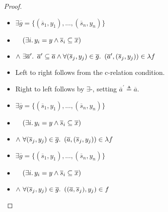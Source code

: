\begin{prop}
\begin{proof}
\begin{itemize}
      \item[\iffs]
        $\exists\overline{g} = \{(\overline{s}_1,y_1),\ldots,(\overline{s}_n,y_n)\}$

      \addtolength{\itemsep}{-.3\baselineskip}
      \item[\phantom{\imps}]
        \quad$\phantom{\land}~(\exists i\ldotp y_i=y\land\overline{s}_i\subseteq\overline{x})$

      \item[\phantom{\imps}]
        \quad$\land~\exists\overline{a}^\prime\ldotp~\overline{a}^\prime\subseteq\overline{a}\land\forall(\overline{s}_j,y_j)\in\overline{g}\ldotp~(\overline{a}^\prime,(\overline{s}_j, y_j))\in\lambda f$

      \addtolength{\itemsep}{.3\baselineskip}

      \item[\phantom{\imps}]
        Left to right follows from the c-relation condition.

      \item[\phantom{\imps}]
        Right to left follows by $\exists$-\Intro, setting $\overline{a}^\prime\triangleq\overline{a}$.

      \item[\iffs]
        $\exists\overline{g} = \{(\overline{s}_1,y_1),\ldots,(\overline{s}_n,y_n)\}$

      \addtolength{\itemsep}{-.3\baselineskip}
      \item[\phantom{\imps}]
        \quad$\phantom{\land}~(\exists i\ldotp y_i=y\land\overline{s}_i\subseteq\overline{x})$

      \item[\phantom{\imps}]
        \quad$\land~\forall(\overline{s}_j,y_j)\in\overline{g}\ldotp~(\overline{a},(\overline{s}_j, y_j))\in\lambda f$

      \addtolength{\itemsep}{.3\baselineskip}

      \item[\iffs]
        $\exists\overline{g} = \{(\overline{s}_1,y_1),\ldots,(\overline{s}_n,y_n)\}$

      \addtolength{\itemsep}{-.3\baselineskip}
      \item[\phantom{\imps}]
        \quad$\phantom{\land}~(\exists i\ldotp y_i=y\land\overline{s}_i\subseteq\overline{x})$

      \item[\phantom{\imps}]
        \quad$\land~\forall(\overline{s}_j,y_j)\in\overline{g}\ldotp~((\overline{a},\overline{s}_j), y_j)\in f$
        \marginnote{\Def-$\lambda\cdot$}


\end{itemize}
\end{proof}
\end{prop}
